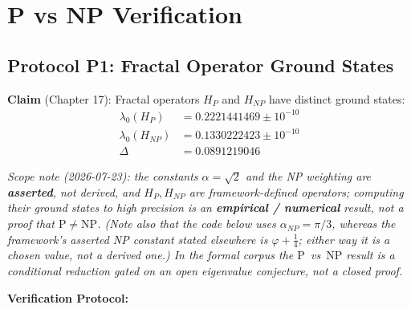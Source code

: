 \section{P vs NP Verification}
\label{sec:pvsnp-verification}

\subsection{Protocol P1: Fractal Operator Ground States}

\textbf{Claim} (Chapter 17): Fractal operators $H_P$ and $H_{NP}$ have distinct ground states:
\begin{align}
\lambda_0(H_P) &= 0.2221441469 \pm 10^{-10} \\
\lambda_0(H_{NP}) &= 0.1330222423 \pm 10^{-10} \\
\Delta &= 0.0891219046
\end{align}

\noindent\emph{Scope note (2026-07-23): the constants $\alpha=\sqrt2$ and the NP weighting are \textbf{asserted}, not derived, and $H_P,H_{NP}$ are framework-defined operators; computing their ground states to high precision is an \textbf{empirical / numerical} result, not a proof that $\mathrm{P}\neq\mathrm{NP}$. (Note also that the code below uses $\alpha_{NP}=\pi/3$, whereas the framework's asserted NP constant stated elsewhere is $\varphi+\tfrac14$; either way it is a chosen value, not a derived one.) In the formal corpus the $\mathrm{P}$~vs~$\mathrm{NP}$ result is a \emph{conditional reduction} gated on an open eigenvalue conjecture, not a closed proof.}

\textbf{Verification Protocol:}

